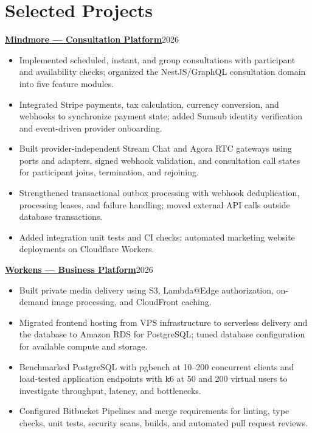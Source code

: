 \documentclass[a4paper,10pt]{article}
\newcommand{\project}[3]{\textbf{\href{#2}{#1}}\hfill #3\par}
\begin{document}
\section{Selected Projects}
\project{Mindmore --- Consultation Platform}{https://mindmore.co.uk/}{2026}
\begin{itemize}
\item Implemented scheduled, instant, and group consultations with participant and availability checks; organized the NestJS/GraphQL consultation domain into five feature modules.
\item Integrated Stripe payments, tax calculation, currency conversion, and webhooks to synchronize payment state; added Sumsub identity verification and event-driven provider onboarding.
\item Built provider-independent Stream Chat and Agora RTC gateways using ports and adapters, signed webhook validation, and consultation call states for participant joins, termination, and rejoining.
\item Strengthened transactional outbox processing with webhook deduplication, processing leases, and failure handling; moved external API calls outside database transactions.
\item Added integration unit tests and CI checks; automated marketing website deployments on Cloudflare Workers.
\end{itemize}

\newpage
\project{Workens --- Business Platform}{https://workens.com}{2026}
\begin{itemize}
\item Built private media delivery using S3, Lambda@Edge authorization, on-demand image processing, and CloudFront caching.
\item Migrated frontend hosting from VPS infrastructure to serverless delivery and the database to Amazon RDS for PostgreSQL; tuned database configuration for available compute and storage.
\item Benchmarked PostgreSQL with pgbench at 10--200 concurrent clients and load-tested application endpoints with k6 at 50 and 200 virtual users to investigate throughput, latency, and bottlenecks.
\item Configured Bitbucket Pipelines and merge requirements for linting, type checks, unit tests, security scans, builds, and automated pull request reviews.
\end{itemize}
\end{document}
